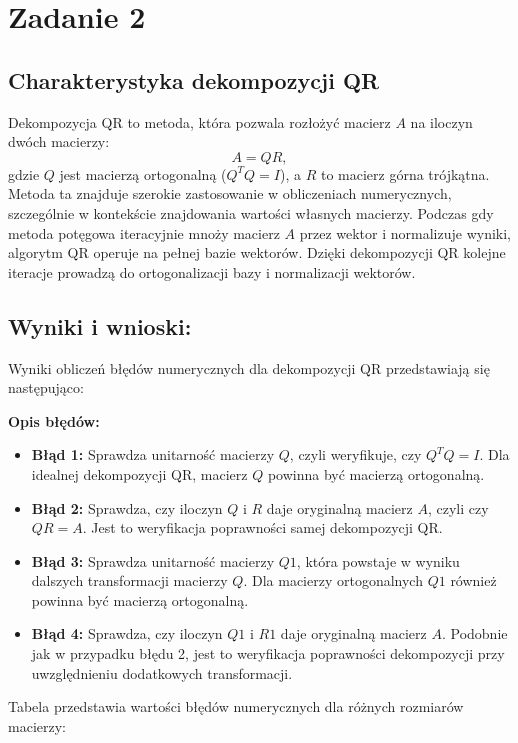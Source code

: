 \section{Zadanie 2}

\subsection{Charakterystyka dekompozycji QR}

Dekompozycja QR to metoda, która pozwala rozłożyć macierz \( A \) na iloczyn dwóch macierzy:  
\[
A = QR,
\]  
gdzie \( Q \) jest macierzą ortogonalną (\( Q^T Q = I \)), a \( R \) to macierz górna trójkątna. Metoda ta znajduje szerokie zastosowanie w obliczeniach numerycznych, szczególnie w kontekście znajdowania wartości własnych macierzy. 
Podczas gdy metoda potęgowa iteracyjnie mnoży macierz \( A \) przez wektor i normalizuje wyniki, algorytm QR operuje na pełnej bazie wektorów. Dzięki dekompozycji QR kolejne iteracje prowadzą do ortogonalizacji bazy i normalizacji wektorów.

\subsection{Wyniki i wnioski:}

Wyniki obliczeń błędów numerycznych dla dekompozycji QR przedstawiają się następująco:

\textbf{Opis błędów:}
\begin{itemize}
\item \textbf{Błąd 1:} Sprawdza unitarność macierzy \( Q \), czyli weryfikuje, czy \( Q^T Q = I \). Dla idealnej dekompozycji QR, macierz \( Q \) powinna być macierzą ortogonalną.
\item \textbf{Błąd 2:} Sprawdza, czy iloczyn \( Q \) i \( R \) daje oryginalną macierz \( A \), czyli czy \( Q R = A \). Jest to weryfikacja poprawności samej dekompozycji QR.
\item  \textbf{Błąd 3:} Sprawdza unitarność macierzy \( Q1 \), która powstaje w wyniku dalszych transformacji macierzy \( Q \). Dla macierzy ortogonalnych \( Q1 \) również powinna być macierzą ortogonalną.
\item  \textbf{Błąd 4:} Sprawdza, czy iloczyn \( Q1 \) i \( R1 \) daje oryginalną macierz \( A \). Podobnie jak w przypadku błędu 2, jest to weryfikacja poprawności dekompozycji przy uwzględnieniu dodatkowych transformacji.
\end{itemize}
Tabela przedstawia wartości błędów numerycznych dla różnych rozmiarów macierzy:

